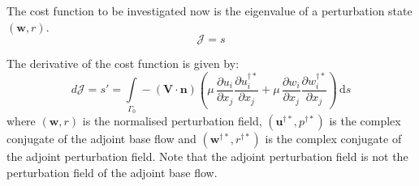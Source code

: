 \documentclass[12pt, a4paper]{article}
\begin{document}
        The cost function to be investigated now is the eigenvalue of a perturbation state $(\mathbf{w}, r)$.
        \begin{equation} \label{cost_function_eigenvalue}
            \mathcal{J} = s
        \end{equation}
        
        The derivative of the cost function is given by:
        \begin{equation}
            d \mathcal{J} = s' = \int\limits_{\Gamma_0} - (\mathbf{V \cdot n}) \left( 
                \mu \, \frac{\partial u_i}{\partial x_j} \frac{\partial u^{\dagger*}_i}{\partial x_j} + 
                \mu \, \frac{\partial w_i}{\partial x_j} \frac{\partial w^{\dagger*}_i}{\partial x_j}
            \right) \, \mathrm{d} s 
        \end{equation}
        where $(\mathbf{w},r)$ is the normalised perturbation field, $(\mathbf{u^{\dagger*}},p^{\dagger*})$ is the complex conjugate of the adjoint base flow and $(\mathbf{w^{\dagger*}},r^{\dagger*})$ is the complex conjugate of the adjoint perturbation field. Note that the adjoint perturbation field is not the perturbation field of the adjoint base flow.
        
\end{document}
